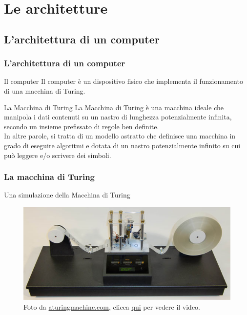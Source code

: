 \section[Le architetture]{Le architetture}

\subsection[L'architettura di un computer]{L'architettura di un computer}


\begin{frame}
	\frametitle{L'architettura di un computer}
	 
	\begin{block}{Il computer}
		Il computer è un dispositivo fisico che implementa il funzionamento di una macchina di Turing.
	\end{block}
	\begin{block}{La Macchina di Turing}
		La Macchina di Turing è una macchina ideale che manipola i dati contenuti su un nastro di lunghezza potenzialmente infinita, secondo un insieme prefissato di regole ben definite.\\
		In altre parole, si tratta di un modello astratto che definisce una macchina in grado di eseguire algoritmi e dotata di un nastro potenzialmente infinito su cui può leggere e/o scrivere dei simboli.
	\end{block}
\end{frame}


\begin{frame}
	\frametitle{La macchina di Turing}
	
	\begin{block}{Una simulazione della Macchina di Turing}
		\begin{figure}[!htbp]
			\centering 
			\includegraphics[width=0.9\linewidth]{images/2_le_architetture/turing_machine.jpg}
			\caption{Foto da \href{https://aturingmachine.com/}{aturingmachine.com}, clicca \underline{\href{https://www.youtube.com/watch?v=E3keLeMwfHY}{qui}} per vedere il video.}
		\end{figure}
	\end{block}
\end{frame}


